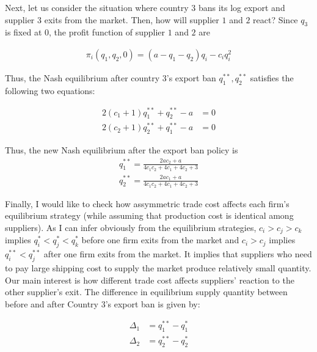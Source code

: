 \documentclass[a4paper,12pt]{article}
\begin{document}
Next, let us consider the situation where country $3$ bans its log export and supplier $3$ exits from the market. Then, how will supplier $1$ and $2$ react? Since $q_3$ is fixed at $0$, the profit function of supplier $1$ and $2$ are 

\begin{align}
    \pi_i (q_1, q_2, 0) = (a - q_1 - q_2) q_{i} - c_{i} q_i ^ 2 
\end{align}

Thus, the Nash equilibrium after country $3$'s export ban $q_1^{**}, q_2^{**}$ satisfies the following two equations:

\begin{align}
    2(c_1 + 1) q_1^{**} + q_2 ^{**} - a &= 0 \\
    2(c_2 + 1) q_2^{**} + q_1 ^ {**} - a &= 0 
\end{align}

Thus, the new Nash equilibrium after the export ban policy is
\begin{align}
    q_1^{**} = \frac{2 a c_{2} + a}{4 c_{1} c_{2} + 4 c_{1} + 4 c_{2} + 3} \\
    q_2^{**} = \frac{2 a c_{1} + a}{4 c_{1} c_{2} + 4 c_{1} + 4 c_{2} + 3}
\end{align}

Finally, I would like to check how assymmetric trade cost affects each firm's equilibrium strategy (while assuming that production cost is identical among suppliers). As I can infer obviously from the equilibrium strategies, $c_i > c_j > c_k$ implies $q_i^* < q_j^* < q_k^*$ before one firm exits from the market and $c_i > c_j$ implies $q_i^{**} < q_j^{**}$ after one firm exits from the market. It implies that suppliers who need to pay large shipping cost to supply the market produce relatively small quantity. Our main interest is how different trade cost affects suppliers' reaction to the other supplier's exit. The difference in equilibrium supply quantity between before and after Country $3$'s export ban is given by:

\begin{align}
    \Delta_1 &= q_1^{**} - q_1^{*} \\
    \Delta_2 &= q_2^{**} - q_2^{*}
\end{align}
\end{document}
